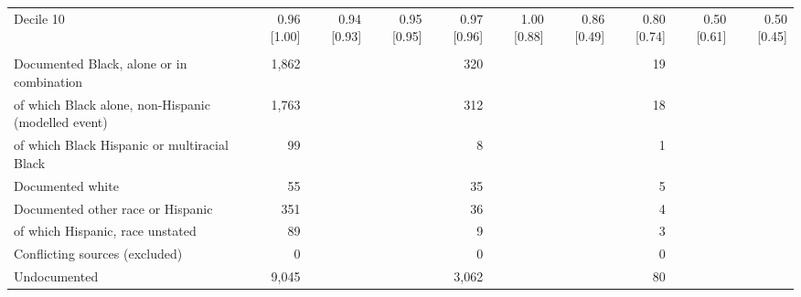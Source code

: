 \begin{table}[H]
{\begin{tabular}[t]{lrrrrrrrrr}
\hspace{1em}Decile 10 & 0.96 [1.00] & 0.94 [0.93] & 0.95 [0.95] & 0.97 [0.96] & 1.00 [0.88] & 0.86 [0.49] & 0.80 [0.74] & 0.50 [0.61] & 0.50 [0.45]\\
\addlinespace[0.3em]
\multicolumn{10}{l}{\textit{Panel E. Persons}}\\
\hspace{1em}Documented Black, alone or in combination & 1,862 &  &  & 320 &  &  & 19 &  & \\
\hspace{1em}of which Black alone, non-Hispanic (modelled event) & 1,763 &  &  & 312 &  &  & 18 &  & \\
\hspace{1em}of which Black Hispanic or multiracial Black & 99 &  &  & 8 &  &  & 1 &  & \\
\hspace{1em}Documented white & 55 &  &  & 35 &  &  & 5 &  & \\
\hspace{1em}Documented other race or Hispanic & 351 &  &  & 36 &  &  & 4 &  & \\
\hspace{1em}of which Hispanic, race unstated & 89 &  &  & 9 &  &  & 3 &  & \\
\hspace{1em}Conflicting sources (excluded) & 0 &  &  & 0 &  &  & 0 &  & \\
\hspace{1em}Undocumented & 9,045 &  &  & 3,062 &  &  & 80 &  & \\
\bottomrule
\end{tabular}}
\end{table}


